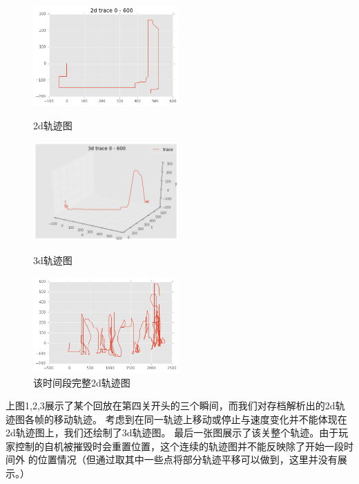 \documentclass[UTF8]{ctexart}
\begin{document}
\begin{figure}[H]
\begin{minipage}[t]{0.5\linewidth}
\centering
\includegraphics[width=2.2in]{images/trace2d.png}
\caption{2d轨迹图}
\end{minipage}
\begin{minipage}[t]{0.5\linewidth}
\centering
\includegraphics[width=2.2in]{images/trace3d.png}
\caption{3d轨迹图}
\end{minipage}
\begin{minipage}[t]{0.5\linewidth}
\centering
\includegraphics[width=2.2in]{images/trace2dfull.png}
\caption{该时间段完整2d轨迹图}
\end{minipage}
\end{figure}

上图1,2,3展示了某个回放在第四关开头的三个瞬间，而我们对存档解析出的2d轨迹图各帧的移动轨迹。
考虑到在同一轨迹上移动或停止与速度变化并不能体现在2d轨迹图上，我们还绘制了3d轨迹图。
最后一张图展示了该关整个轨迹。由于玩家控制的自机被摧毁时会重置位置，这个连续的轨迹图并不能反映除了开始一段时间外
的位置情况（但通过取其中一些点将部分轨迹平移可以做到，这里并没有展示。）
\end{document}
